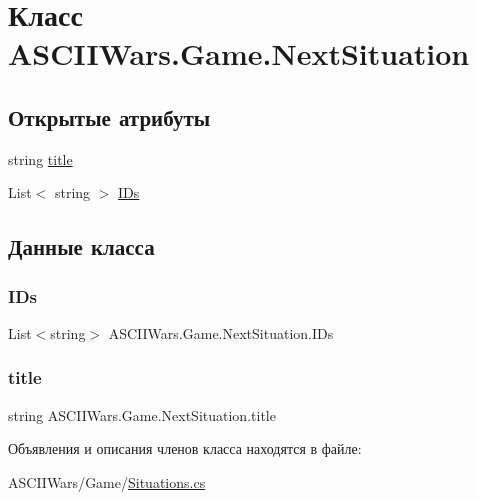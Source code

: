 \hypertarget{class_a_s_c_i_i_wars_1_1_game_1_1_next_situation}{}\section{Класс A\+S\+C\+I\+I\+Wars.\+Game.\+Next\+Situation}
\label{class_a_s_c_i_i_wars_1_1_game_1_1_next_situation}
\subsection*{Открытые атрибуты}
\begin{DoxyCompactItemize}
\item 
string \hyperlink{class_a_s_c_i_i_wars_1_1_game_1_1_next_situation_a5d21d7465e8bb363277591d61759ba1d}{title}
\item 
List$<$ string $>$ \hyperlink{class_a_s_c_i_i_wars_1_1_game_1_1_next_situation_a882f10c3c66963ef3e67c9e30689c968}{I\+Ds}
\end{DoxyCompactItemize}


\subsection{Данные класса}
\hypertarget{class_a_s_c_i_i_wars_1_1_game_1_1_next_situation_a882f10c3c66963ef3e67c9e30689c968}{}\label{class_a_s_c_i_i_wars_1_1_game_1_1_next_situation_a882f10c3c66963ef3e67c9e30689c968} 
\subsubsection{\texorpdfstring{I\+Ds}{IDs}}
{\footnotesize\ttfamily List$<$string$>$ A\+S\+C\+I\+I\+Wars.\+Game.\+Next\+Situation.\+I\+Ds}

\hypertarget{class_a_s_c_i_i_wars_1_1_game_1_1_next_situation_a5d21d7465e8bb363277591d61759ba1d}{}\label{class_a_s_c_i_i_wars_1_1_game_1_1_next_situation_a5d21d7465e8bb363277591d61759ba1d} 
\subsubsection{\texorpdfstring{title}{title}}
{\footnotesize\ttfamily string A\+S\+C\+I\+I\+Wars.\+Game.\+Next\+Situation.\+title}



Объявления и описания членов класса находятся в файле\+:\begin{DoxyCompactItemize}
\item 
A\+S\+C\+I\+I\+Wars/\+Game/\hyperlink{_situations_8cs}{Situations.\+cs}\end{DoxyCompactItemize}
